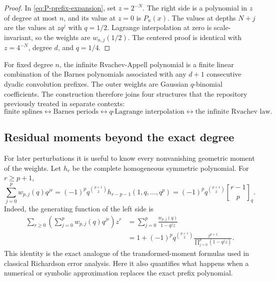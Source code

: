 \documentclass[11pt,oneside]{article}
\theoremstyle{frontier}
\theoremstyle{definition}
\theoremstyle{remark}
\newcommand{\qbinom}[3]{\genfrac{[}{]}{0pt}{}{#1}{#2}_{#3}}
\begin{document}
\begin{proof}
In \eqref{eq:P-prefix-expansion}, set $z=2^{-N}$.  The right side is a polynomial in $z$ of degree
at most $n$, and its value at $z=0$ is $P_n(x)$.  The values at depths $N+j$ are the values at
$zq^j$ with $q=1/2$.  Lagrange interpolation at zero is scale-invariant, so the weights are
$w_{n,j}(1/2)$.  The centered proof is identical with $z=4^{-N}$, degree $d$, and $q=1/4$.
\end{proof}

\begin{resultbox}
For fixed degree $n$, the infinite Rvachev-Appell polynomial is a finite linear combination of the
Barnes polynomials associated with any $d+1$ consecutive dyadic convolution prefixes.  The outer
weights are Gaussian $q$-binomial coefficients.  The construction therefore joins four structures
that the repository previously treated in separate contexts:
\[
 \text{finite splines}
 \longleftrightarrow
 \text{Barnes periods}
 \longleftrightarrow
 \text{$q$-Lagrange interpolation}
 \longleftrightarrow
 \text{the infinite Rvachev law}.
\]
\end{resultbox}

\subsection{Residual moments beyond the exact degree}

For later perturbations it is useful to know every nonvanishing geometric moment of the weights.
Let $h_r$ be the complete homogeneous symmetric polynomial.  For $r\ge p+1$,
\begin{equation}
 \boxed{
 \sum_{j=0}^{p}w_{p,j}(q)q^{jr}
 =(-1)^pq^{\binom{p+1}{2}}
 h_{r-p-1}(1,q,\ldots,q^p)
 =(-1)^pq^{\binom{p+1}{2}}\qbinom{r-1}{p}{q}.
 }
 \label{eq:w-residual}
\end{equation}
Indeed, the generating function of the left side is
\begin{align*}
 \sum_{r\ge0}\left(\sum_{j=0}^{p}w_{p,j}(q)q^{jr}\right)z^r
 &=\sum_{j=0}^{p}\frac{w_{p,j}(q)}{1-q^jz}\\
 &=1+(-1)^pq^{\binom{p+1}{2}}
 \frac{z^{p+1}}{\prod_{j=0}^{p}(1-q^jz)}.
\end{align*}
This identity is the exact analogue of the transformed-moment formulas used in classical
Richardson error analysis.  Here it also quantifies what happens when a numerical or symbolic
approximation replaces the exact prefix polynomial.
\end{document}
